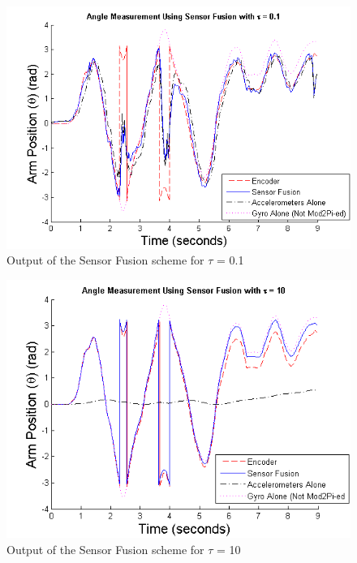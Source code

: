 \documentclass{article}
\theoremstyle{plain}
\theoremstyle{definition}
\theoremstyle{remark}
\begin{document}
\begin{figure}[hbt]
\begin{center}
\includegraphics[width = 14cm]{SF_output_bad}
\caption{Output of the Sensor Fusion scheme for $\tau$ = 0.1}
\label{SF_output_bad_low}
\end{center}
\end{figure}

\begin{figure}[hbt]
\begin{center}
\includegraphics[width = 12cm]{SF_output_bad_high}
\caption{Output of the Sensor Fusion scheme for $\tau$ = 10}
\label{SF_output_bad_high}
\end{center}
\end{figure}
\end{document}
